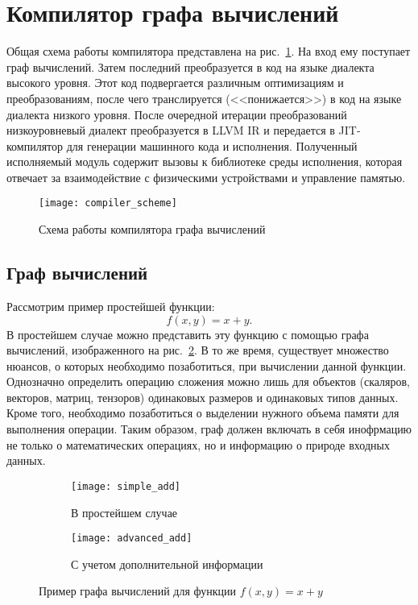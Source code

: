 \clearpage

\section{Компилятор графа вычислений}

Общая схема работы компилятора представлена на рис.~\ref{fig:compiler_scheme}. 
На вход ему поступает граф вычислений. Затем последний преобразуется в код на языке
диалекта высокого уровня. Этот код подвергается различным оптимизациям и
преобразованиям, после чего транслируется (<<понижается>>) в код на языке
диалекта низкого уровня. После очередной итерации преобразований низкоуровневый
диалект преобразуется в LLVM IR и передается в JIT-компилятор для генерации
машинного кода и исполнения. Полученный исполняемый модуль содержит вызовы к
библиотеке среды исполнения, которая отвечает за взаимодействие с физическими
устройствами и управление памятью.

\begin{figure}[h]
  \centering
  \texttt{[image: compiler\_scheme]}
  \caption{Схема работы компилятора графа вычислений}
  \label{fig:compiler_scheme}
\end{figure}
\subsection{Граф вычислений}

Рассмотрим пример простейшей функции:
\[
  f(x, y) = x + y.
\]
В простейшем случае можно представить эту функцию с помощью графа вычислений,
изображенного на рис.~\ref{fig:simple_add}. В то же время, существует множество
нюансов, о которых необходимо позаботиться, при вычислении данной функции.
Однозначно определить операцию сложения можно лишь для объектов (скаляров,
векторов, матриц, тензоров) одинаковых размеров и одинаковых типов данных.
Кроме того, необходимо позаботиться о выделении нужного объема памяти для
выполнения операции. Таким образом, граф должен включать в себя инофрмацию не
только о математических операциях, но и информацию о природе входных данных. 

\begin{figure}[h]
  \begin{subfigure}{.3\textwidth}
    \centering
    \texttt{[image: simple\_add]}
    \caption{В простейшем случае}
    \label{fig:simple_add}
  \end{subfigure}
  \begin{subfigure}{.7\textwidth}
    \centering
    \texttt{[image: advanced\_add]}
    \caption{С учетом дополнительной информации}
    \label{fig:advanced_add}
  \end{subfigure}
  \caption{Пример графа вычислений для функции $f(x, y) = x + y$}
  \label{fig:add}
\end{figure}



